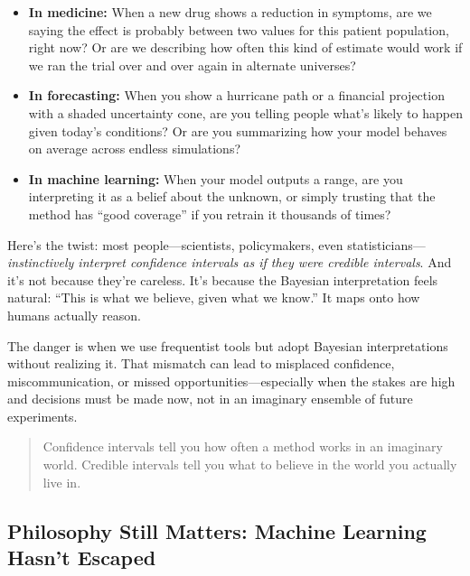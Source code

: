 \begin{itemize}
    \item \textbf{In medicine:} When a new drug shows a reduction in symptoms, are we saying the effect is probably between two values for this patient population, right now? Or are we describing how often this kind of estimate would work if we ran the trial over and over again in alternate universes?

    \item \textbf{In forecasting:} When you show a hurricane path or a financial projection with a shaded uncertainty cone, are you telling people what’s likely to happen given today’s conditions? Or are you summarizing how your model behaves on average across endless simulations?

    \item \textbf{In machine learning:} When your model outputs a range, are you interpreting it as a belief about the unknown, or simply trusting that the method has “good coverage” if you retrain it thousands of times?
\end{itemize}

Here’s the twist: most people—scientists, policymakers, even statisticians—\textit{instinctively interpret confidence intervals as if they were credible intervals}. And it’s not because they’re careless. It’s because the Bayesian interpretation feels natural: “This is what we believe, given what we know.” It maps onto how humans actually reason.

The danger is when we use frequentist tools but adopt Bayesian interpretations without realizing it. That mismatch can lead to misplaced confidence, miscommunication, or missed opportunities—especially when the stakes are high and decisions must be made now, not in an imaginary ensemble of future experiments.

\begin{quote}
Confidence intervals tell you how often a method works in an imaginary world.  
Credible intervals tell you what to believe in the world you actually live in.
\end{quote}







\subsection{Philosophy Still Matters: Machine Learning Hasn't Escaped}

